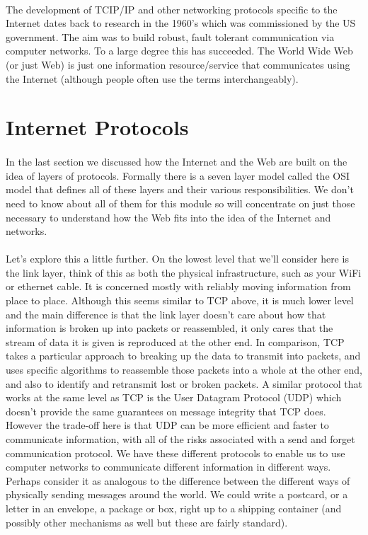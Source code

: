 \documentclass[12pt, a4paper, oneside]{book}
\begin{document}
\paragraph{} The development of TCIP/IP and other networking protocols specific to the Internet dates back to research in the 1960’s which was commissioned by the US government. The aim was to build robust, fault tolerant communication via computer networks. To a large degree this has succeeded. The World Wide Web (or just Web) is just one information resource/service that communicates using the Internet (although people often use the terms interchangeably).


\section{Internet Protocols}
\paragraph{} In the last section we discussed how the Internet and the Web are built on the idea of layers of protocols. Formally there is a seven layer model called the OSI model that defines all of these layers and their various responsibilities. We don't need to know about all of them for this module so will concentrate on just those necessary to understand how the Web fits into the idea of the Internet and networks.
\paragraph{} Let's explore this a little further. On the lowest level that we'll consider here is the link layer, think of this as both the physical infrastructure, such as your WiFi or ethernet cable. It is concerned mostly with reliably moving information from place to place. Although this seems similar to TCP above, it is much lower level and the main difference is that the link layer doesn't care about how that information is broken up into packets or reassembled, it only cares that the stream of data it is given is reproduced at the other end. In comparison, TCP takes a particular approach to breaking up the data to transmit into packets, and uses specific algorithms to reassemble those packets into a whole at the other end, and also to identify and retransmit lost or broken packets. A similar protocol that works at the same level as TCP is the User Datagram Protocol (UDP) which doesn't provide the same guarantees on message integrity that TCP does. However the trade-off here is that UDP can be more efficient and faster to communicate information, with all of the risks associated with a send and forget communication protocol. We have these different protocols to enable us to use computer networks to communicate different information in different ways. Perhaps consider it as analogous to the difference between the different ways of physically sending messages around the world. We could write a postcard, or a letter in an envelope, a package or box, right up to a shipping container (and possibly other mechanisms as well but these are fairly standard).
\end{document}
